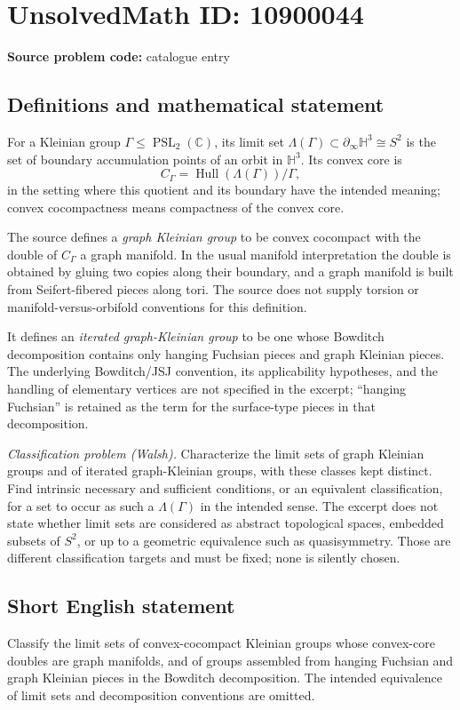 \documentclass[11pt]{article}
\newcommand{\C}{\mathbb{C}}
\begin{document}
\section*{UnsolvedMath ID: 10900044}
\textbf{Source problem code:} catalogue entry
\subsection{Definitions and mathematical statement}
For a Kleinian group \(\Gamma\leq\operatorname{PSL}_2(\C)\), its limit set \(\Lambda(\Gamma)\subset\partial_\infty\mathbb H^3\cong S^2\) is the set of boundary accumulation points of an orbit in \(\mathbb H^3\). Its convex core is
\[
 C_\Gamma=\operatorname{Hull}(\Lambda(\Gamma))/\Gamma,
\]
in the setting where this quotient and its boundary have the intended meaning; convex cocompactness means compactness of the convex core.

The source defines a \emph{graph Kleinian group} to be convex cocompact with the double of \(C_\Gamma\) a graph manifold. In the usual manifold interpretation the double is obtained by gluing two copies along their boundary, and a graph manifold is built from Seifert-fibered pieces along tori. The source does not supply torsion or manifold-versus-orbifold conventions for this definition.

It defines an \emph{iterated graph-Kleinian group} to be one whose Bowditch decomposition contains only hanging Fuchsian pieces and graph Kleinian pieces. The underlying Bowditch/JSJ convention, its applicability hypotheses, and the handling of elementary vertices are not specified in the excerpt; ``hanging Fuchsian'' is retained as the term for the surface-type pieces in that decomposition.

\emph{Classification problem (Walsh).} Characterize the limit sets of graph Kleinian groups and of iterated graph-Kleinian groups, with these classes kept distinct. Find intrinsic necessary and sufficient conditions, or an equivalent classification, for a set to occur as such a \(\Lambda(\Gamma)\) in the intended sense. The excerpt does not state whether limit sets are considered as abstract topological spaces, embedded subsets of \(S^2\), or up to a geometric equivalence such as quasisymmetry. Those are different classification targets and must be fixed; none is silently chosen.
\subsection{Short English statement}
Classify the limit sets of convex-cocompact Kleinian groups whose convex-core doubles are graph manifolds, and of groups assembled from hanging Fuchsian and graph Kleinian pieces in the Bowditch decomposition. The intended equivalence of limit sets and decomposition conventions are omitted.
\end{document}
